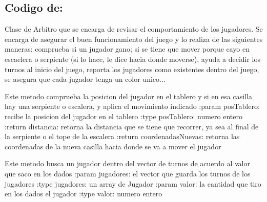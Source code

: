\documentclass[letterpaper,10pt,english]{sphinxmanual}
\begin{document}
\subsection{Codigo de: }
\label{\detokenize{codigo:module-arbitro}}\label{\detokenize{codigo:codigo-de-arbitro}}

\begin{fulllineitems}
\label{\detokenize{codigo:arbitro.Arbitro}}
Clase de Arbitro que se encarga de revisar el comportamiento de los jugadores. Se encarga de
asegurar el buen funcionamiento del juego y lo realiza de las siguientes maneras: comprueba si 
un jugador gano; si se tiene que mover porque cayo en escaelera o serpiente (si lo hace, le dice
hacia donde moverse), ayuda a decidir los turnos al inicio del juego, reporta los jugadores como
existentes dentro del juego, se asegura que cada jugador tenga un color unico...

\begin{fulllineitems}
\label{\detokenize{codigo:arbitro.Arbitro.aplicarReglasMovimiento}}
Este metodo comprueba la posicion del jugador en el tablero y si en esa casilla hay una serpiente o escalera, y aplica el movimiento
indicado
:param posTablero: recibe la posicion del jugador en el tablero
:type posTablero: numero entero
:return distancia: retorna la distancia que se tiene que recorrer, ya sea al final de la serpiente o el tope de la escalera
:return coordenadasNuevas: retorna las coordenadas de la nueva casilla hacia donde se va a mover el jugador

\end{fulllineitems}


\begin{fulllineitems}
\label{\detokenize{codigo:arbitro.Arbitro.buscar_jugador}}
Este metodo busca un jugador dentro del vector de turnos de acuerdo al valor que saco en los dados
:param jugadores: el vector que guarda los turnos de los jugadores
:type jugadores: un array de Jugador
:param valor: la cantidad que tiro en los dados el jugador
:type valor: numero entero


\end{fulllineitems}
\end{fulllineitems}
\end{document}
